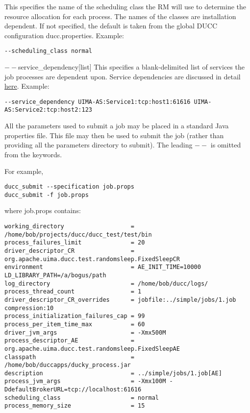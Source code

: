 \begin{description}
           \item[$--$scheduling\_class {[classname]} ] This specifies the name of the scheduling class
             the RM will use to determine the resource allocation for each process. The names of the
             classes are installation dependent. If not specified, the default is taken from the
             global DUCC configuration ducc.properties.  Example:
             \begin{verbatim}
--scheduling_class normal 
             \end{verbatim}
          

           \begin{sloppypar}             
           \item[$--$service\_dependency{[list]}] This specifies a blank-delimited list of services the job
             processes are dependent upon. Service dependencies are discussed in detail
             \hyperref[sec:service.endpoints]{here}. Example:
\begin{verbatim}
--service_dependency UIMA-AS:Service1:tcp:host1:61616 UIMA-AS:Service2:tcp:host2:123 
\end{verbatim}
           \end{sloppypar}
           
           \item[$--$specification, $-$f {[file]}  ]

             All the parameters used to submit a job may be placed in a standard Java properties file. 
             This file may then be used to submit the job (rather than providing all the parameters 
             directory to submit). The leading $--$ is omitted from the keywords.

             For example, 
\begin{verbatim}
ducc_submit --specification job.props 
ducc_submit -f job.props 
\end{verbatim}

             where job.props contains: 
\begin{verbatim}
working_directory                   = /home/bob/projects/ducc/ducc_test/test/bin 
process_failures_limit              = 20 
driver_descriptor_CR                = org.apache.uima.ducc.test.randomsleep.FixedSleepCR 
environment                         = AE_INIT_TIME=10000 LD_LIBRARY_PATH=/a/bogus/path 
log_directory                       = /home/bob/ducc/logs/ 
process_thread_count                = 1 
driver_descriptor_CR_overrides      = jobfile:../simple/jobs/1.job compression:10 
process_initialization_failures_cap = 99 
process_per_item_time_max           = 60 
driver_jvm_args                     = -Xmx500M 
process_descriptor_AE               = org.apache.uima.ducc.test.randomsleep.FixedSleepAE 
classpath                           = /home/bob/duccapps/ducky_process.jar 
description                         = ../simple/jobs/1.job[AE] 
process_jvm_args                    = -Xmx100M -DdefaultBrokerURL=tcp://localhost:61616 
scheduling_class                    = normal 
process_memory_size                 = 15 
\end{verbatim}


\end{description}
